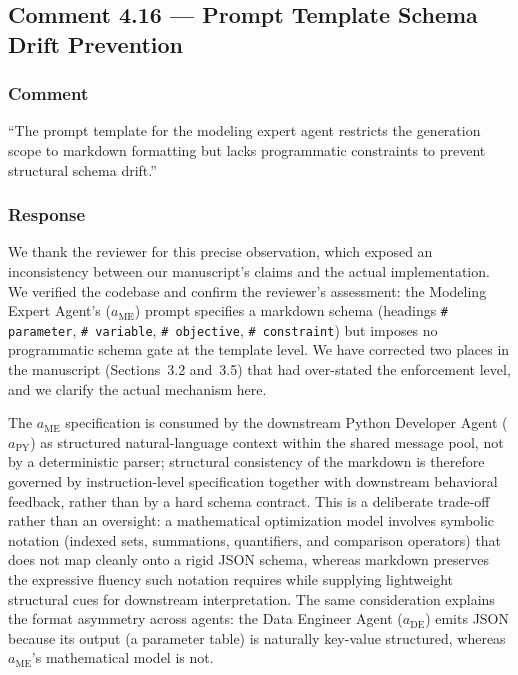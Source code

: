 \documentclass[11pt,a4paper]{article}
\begin{document}
\subsection{Comment 4.16 --- Prompt Template Schema Drift Prevention}

\subsubsection{Comment}
``The prompt template for the modeling expert agent restricts the generation scope to markdown formatting but lacks programmatic constraints to prevent structural schema drift.''

\subsubsection{Response}
We thank the reviewer for this precise observation, which exposed an inconsistency between our manuscript's claims and the actual implementation. We verified the codebase and confirm the reviewer's assessment: the Modeling Expert Agent's ($a_{\text{ME}}$) prompt specifies a markdown schema (headings \texttt{\# parameter}, \texttt{\# variable}, \texttt{\# objective}, \texttt{\# constraint}) but imposes no programmatic schema gate at the template level. We have corrected two places in the manuscript (Sections~3.2 and~3.5) that had over-stated the enforcement level, and we clarify the actual mechanism here.

The $a_{\text{ME}}$ specification is consumed by the downstream Python Developer Agent ($a_{\text{PY}}$) as structured natural-language context within the shared message pool, not by a deterministic parser; structural consistency of the markdown is therefore governed by instruction-level specification together with downstream behavioral feedback, rather than by a hard schema contract. This is a deliberate trade-off rather than an oversight: a mathematical optimization model involves symbolic notation (indexed sets, summations, quantifiers, and comparison operators) that does not map cleanly onto a rigid JSON schema, whereas markdown preserves the expressive fluency such notation requires while supplying lightweight structural cues for downstream interpretation. The same consideration explains the format asymmetry across agents: the Data Engineer Agent ($a_{\text{DE}}$) emits JSON because its output (a parameter table) is naturally key-value structured, whereas $a_{\text{ME}}$'s mathematical model is not.
\end{document}

